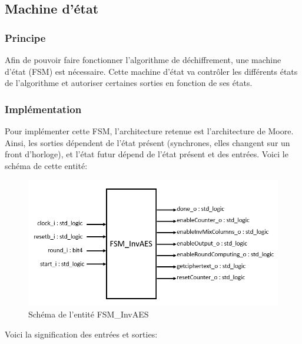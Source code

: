 \documentclass[a4paper, 12pt]{article}
\begin{document}
	\subsection{Machine d'état}
		\subsubsection{Principe}
		Afin de pouvoir faire fonctionner l'algorithme de déchiffrement, une machine d'état (FSM) est nécessaire. Cette machine d'état va contrôler les différents états de l'algorithme et autoriser certaines sorties en fonction de ses états.
		\subsubsection{Implémentation}
		Pour implémenter cette FSM, l'architecture retenue est l'architecture de Moore. Ainsi, les sorties dépendent de l'état présent (synchrones, elles changent sur un front d'horloge), et l'état futur dépend de l'état présent et des entrées. 
Voici le schéma de cette entité:
			\begin{figure}[H]
				\begin{center}
				\includegraphics[scale=0.6]{Images/FSMInvAESEntity.png}
				\end{center}
				\caption{Schéma de l'entité FSM\_InvAES}
				\label{FSMInvAESEntity}
			\end{figure}
\par Voici la signification des entrées et sorties:
\end{document}
